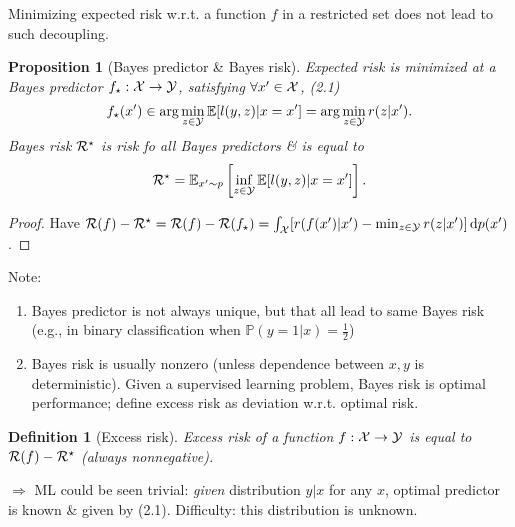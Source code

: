\documentclass{article}
\newtheorem{definition}{Definition}
\newtheorem{proposition}{Proposition}
\begin{document}
\begin{enumerate}
\begin{itemize}
\begin{itemize}
\begin{itemize}
				Minimizing expected risk w.r.t. a function $f$ in a restricted set does not lead to such decoupling.
				
				\begin{proposition}[Bayes predictor \& Bayes risk]
					Expected risk is minimized at a Bayes predictor $f_\star:{\cal X}\to{\cal Y}$, satisfying $\forall x'\in{\cal X}$, (2.1)
					\begin{equation}
						f_\star(x')\in\arg\min_{z\in{\cal Y}} \mathbb{E}[l(y,z)|x = x'] = \arg\min_{z\in{\cal Y}} r(z|x').
					\end{equation}
					Bayes risk ${\cal R}^\star$ is risk fo all Bayes predictors \& is equal to
					\begin{equation}
						{\cal R}^\star = \mathbb{E}_{x'\sim p} \left[\inf_{z\in{\cal Y}} \mathbb{E}[l(y,z)|x = x']\right].
					\end{equation}
				\end{proposition}
				
				\begin{proof}
					Have ${\cal R}(f) - {\cal R}^\star = {\cal R}(f) - {\cal R}(f_\star) = \int_{{\cal X}} [r(f(x')|x') - \min_{z\in{\cal Y}} r(z|x')]\,{\rm d}p(x')$.
				\end{proof}
				Note:
				\begin{enumerate}
					\item Bayes predictor is not always unique, but that all lead to same Bayes risk (e.g., in binary classification when $\mathbb{P}(y = 1|x) = \frac{1}{2}$)
					\item Bayes risk is usually nonzero (unless dependence between $x,y$ is deterministic). Given a supervised learning problem, Bayes risk is optimal performance; define excess risk as deviation w.r.t. optimal risk.
				\end{enumerate}
				
				\begin{definition}[Excess risk]
					{\rm Excess risk} of a function $f:{\cal X}\to{\cal Y}$ is equal to ${\cal R}(f) - {\cal R}^\star$ (always nonnegative).
				\end{definition}
				$\Rightarrow$ ML could be seen trivial: {\it given} distribution $y|x$ for any $x$, optimal predictor is known \& given by (2.1). Difficulty: this distribution is unknown.
				

\end{itemize}
\end{itemize}
\end{itemize}
\end{enumerate}
\end{document}
